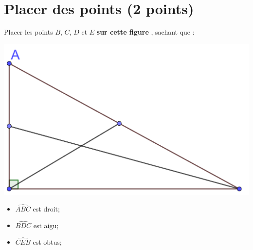 \section{Placer des points (2 points)}

\begin{questions}
	
	

	\question[2] Placer les points $B$, $C$, $D$ et $E$ \textbf{sur cette figure}
	, sachant que :
	
	\begin{multicols}{2}
		
		\begin{center}
			\includegraphics[scale=0.15]{img/ex1}
		\end{center}
		
		\begin{itemize}
			\item $\widehat{ABC}$ est droit;
			\item $\widehat{BDC}$ est aigu;
			\item $\widehat{CEB}$ est obtus;
		\end{itemize}
	\end{multicols}
	
	
\end{questions}

